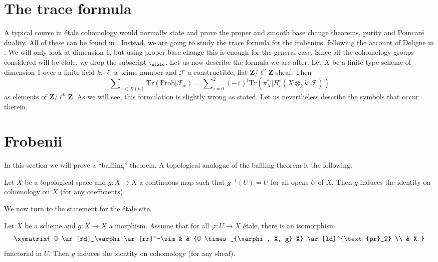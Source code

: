 \section{The trace formula}
\label{section-trace-formula}

\noindent
A typical course in \'etale cohomology would normally state and prove the
proper and smooth base change theorems, purity and Poincar\'e duality. All of
these can be found in \cite[Arcata]{SGA4.5}. Instead, we are going to study the
trace formula for the frobenius, following the account of Deligne in
\cite[Rapport]{SGA4.5}. We will only look at dimension 1, but using proper base
change this is enough for the general case. Since all the cohomology groups
considered will be \'etale, we drop the subscript $_\etale$. Let us
now describe
the formula we are after. Let $X$ be a finite type scheme of dimension 1 over a
finite field $k$, $\ell$ a prime number and $\mathcal{F}$ a constructible, flat
$\mathbf{Z}/\ell^n\mathbf{Z}$ sheaf. Then
\begin{equation}
\label{equation-trace-formula-initial}
\sum\nolimits_{x \in X(k)}
\text{Tr}(\text{Frob} | \mathcal{F}_{\bar x}) =
\sum\nolimits_{i = 0}^2
(-1)^i \text{Tr}(\pi_X^* | H^i_c(X \otimes_k \bar k, \mathcal{F}))
\end{equation}
as elements of $\mathbf{Z}/\ell^n\mathbf{Z}$. As we will see, this formulation
is slightly wrong as stated. Let us nevertheless describe the symbols that
occur therein.




\section{Frobenii}
\label{section-frobenii}

\noindent
In this section we will prove a ``baffling'' theorem.
A topological analogue of the baffling theorem is the following.

\begin{exercise}
\label{exercise-baffling}
Let $X$ be a topological space and $g : X \to X$ a continuous map such that
$g^{-1}(U) = U$ for all opens $U$ of $X$. Then $g$ induces the identity on
cohomology on $X$ (for any coefficients).
\end{exercise}

\noindent
We now turn to the statement for the \'etale site.

\begin{lemma}
\label{lemma-baffling}
Let $X$ be a scheme and $g : X \to X$ a morphism. Assume that for all
$\varphi : U \to X$ \'etale, there is an isomorphism
$$
\xymatrix{
U \ar[rd]_\varphi \ar[rr]^-\sim & & {U
\times_{\varphi, X, g} X} \ar[ld]^{\text{pr}_2} \\
& X
}
$$
functorial in $U$. Then $g$ induces the identity on cohomology (for any sheaf).
\end{lemma}


